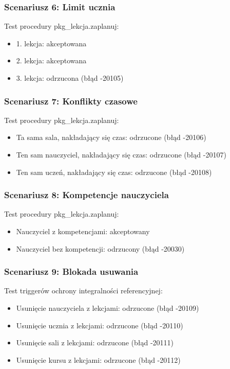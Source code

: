 \documentclass[12pt,a4paper]{article}
\begin{document}
\subsubsection{Scenariusz 6: Limit ucznia}
Test procedury pkg\_lekcja.zaplanuj:
\begin{itemize}[nosep]
    \item 1. lekcja: akceptowana
    \item 2. lekcja: akceptowana
    \item 3. lekcja: odrzucona (błąd -20105)
\end{itemize}

\subsubsection{Scenariusz 7: Konflikty czasowe}
Test procedury pkg\_lekcja.zaplanuj:
\begin{itemize}[nosep]
    \item Ta sama sala, nakładający się czas: odrzucone (błąd -20106)
    \item Ten sam nauczyciel, nakładający się czas: odrzucone (błąd -20107)
    \item Ten sam uczeń, nakładający się czas: odrzucone (błąd -20108)
\end{itemize}

\subsubsection{Scenariusz 8: Kompetencje nauczyciela}
Test procedury pkg\_lekcja.zaplanuj:
\begin{itemize}[nosep]
    \item Nauczyciel z kompetencjami: akceptowany
    \item Nauczyciel bez kompetencji: odrzucony (błąd -20030)
\end{itemize}

\subsubsection{Scenariusz 9: Blokada usuwania}
Test triggerów ochrony integralności referencyjnej:
\begin{itemize}[nosep]
    \item Usunięcie nauczyciela z lekcjami: odrzucone (błąd -20109)
    \item Usunięcie ucznia z lekcjami: odrzucone (błąd -20110)
    \item Usunięcie sali z lekcjami: odrzucone (błąd -20111)
    \item Usunięcie kursu z lekcjami: odrzucone (błąd -20112)
\end{itemize}
\end{document}
